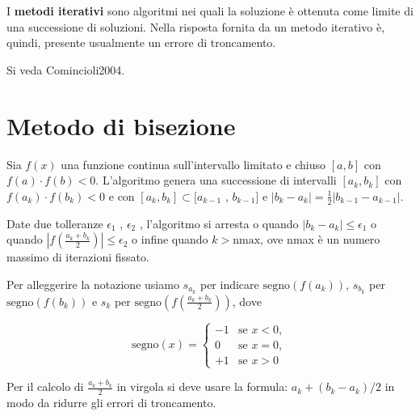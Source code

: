 \documentclass[10pt]{article}
\begin{document}
I \textbf{metodi iterativi} sono algoritmi nei quali la soluzione è ottenuta come limite di una successione di soluzioni. Nella risposta fornita da un metodo iterativo è, quindi, presente usualmente un errore di troncamento.

Si veda Comincioli2004.

\section{Metodo di bisezione}

Sia $f (x)$ una funzione continua sull'intervallo limitato e chiuso $[a, b]$ con $f (a) \cdot f (b) < 0$. L'algoritmo genera una successione di intervalli
$[a_k , b_k]$ con $f (a_k ) \cdot f (b_k ) < 0$ e con $[a_k , b_k ] \subset [a_{k-1}$ , $b_{k-1} ]$ e $|b_k - a_k | = \frac{1}{2}|b_{k-1} - a_{k-1} |$. 

Date due tolleranze $\epsilon_1$ , $\epsilon_2$ , l’algoritmo si arresta o quando $|b_k - a_k | \leq \epsilon_1$ o quando $|f (\frac {a_k +b_k}{2} )| \leq
\epsilon_2$ o infine quando $k > \text{nmax}$, ove nmax è un numero massimo di iterazioni fissato.

Per alleggerire la notazione usiamo $s_{a_k}$ per indicare $\mathrm{segno} \left(f\left(a_k\right)\right)$,
$s_{b_k}$ per $\mathrm{segno}(f(b_k))$ e
$s_k$ per $\mathrm{segno}(f (\frac {a_k +b_k}{2}))$, dove

\begin{equation}
    \mathrm{segno}(x) =
    \begin{cases}
        -1 & \text{se } x < 0, \\
         0 & \text{{se }} x = 0, \\
        +1 & \text{{se }} x > 0
    \end{cases}
\end{equation}

Per il calcolo di $\frac{a_k+b_k}{2}$ in virgola si deve usare la formula: $a_k + (b_k - a_k) / 2$ in modo da ridurre gli errori di troncamento.
\end{document}
